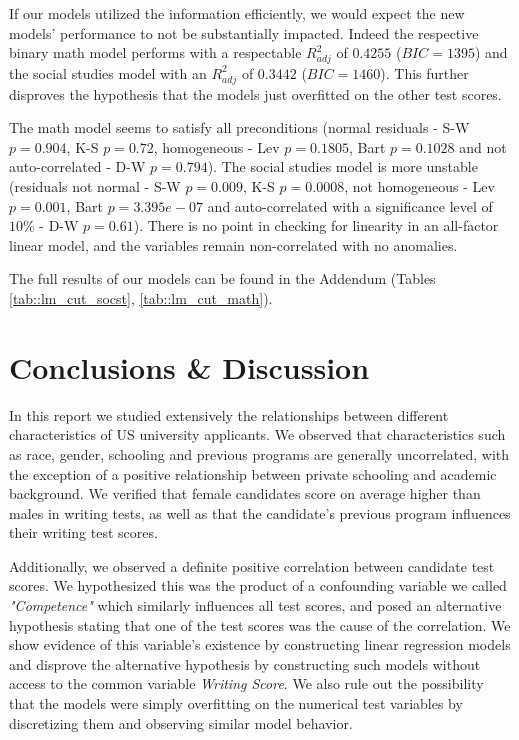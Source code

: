 \documentclass[10pt, a4paper]{article}
\begin{document}
	If our models utilized the information efficiently, we would expect the new models' performance to not be substantially impacted. Indeed the respective binary math model performs with a respectable $R^2_{adj}$ of $0.4255$ ($BIC=1395$) and the social studies model with an $R^2_{adj}$ of $0.3442$ ($BIC=1460$). This further disproves the hypothesis that the models just overfitted on the other test scores.
	
	The math model seems to satisfy all preconditions (normal residuals - S-W $p=0.904$, K-S $p=0.72$, homogeneous - Lev $p=0.1805$, Bart $p=0.1028$ and not auto-correlated - D-W $p=0.794$). The social studies model is more unstable (residuals not normal - S-W $p=0.009$, K-S $p=0.0008$, not homogeneous - Lev $p=0.001$, Bart $p=3.395e-07$ and auto-correlated with a significance level of $10\%$ - D-W $p=0.61$). There is no point in checking for linearity in an all-factor linear model, and the variables remain non-correlated with no anomalies.
	
	The full results of our models can be found in the Addendum (Tables \ref{tab::lm_cut_socst}, \ref{tab::lm_cut_math}).
 

	\section{Conclusions \& Discussion}
	\label{sec::conclusions}
	
	In this report we studied extensively the relationships between different characteristics of US university applicants. We observed that characteristics such as race, gender, schooling and previous programs are generally uncorrelated, with the exception of a positive relationship between private schooling and academic background. We verified that female candidates score on average higher than males in writing tests, as well as that the candidate's previous program influences their writing test scores. 
	
	Additionally, we observed a definite positive correlation between candidate test scores. We hypothesized this was the product of a confounding variable we called \textit{"Competence"} which similarly influences all test scores, and posed an alternative hypothesis stating that one of the test scores was the cause of the correlation. We show evidence of this variable's existence by constructing linear regression models and disprove the alternative hypothesis by constructing such models without access to the common variable \textit{Writing Score}. We also rule out the possibility that the models were simply overfitting on the numerical test variables by discretizing them and observing similar model behavior.
	
\end{document}
